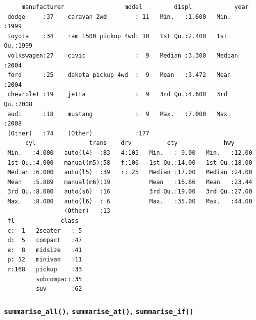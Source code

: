 \documentclass[
  11pt,
]{krantz}
\newenvironment{Shaded}{\begin{snugshade}}{\end{snugshade}}
\newcommand{\CommentTok}[1]{\textcolor[rgb]{0.37,0.37,0.37}{\textit{#1}}}
\newcommand{\KeywordTok}[1]{\textcolor[rgb]{0.27,0.27,0.27}{\textbf{#1}}}
\newcommand{\NormalTok}[1]{#1}
\newcommand{\OperatorTok}[1]{\textcolor[rgb]{0.43,0.43,0.43}{\textbf{#1}}}
\newcommand{\StringTok}[1]{\textcolor[rgb]{0.5,0.5,0.5}{#1}}
\begin{document}
\begin{Shaded}
\end{Shaded}

\begin{verbatim}
     manufacturer                 model         displ            year     
 dodge     :37    caravan 2wd        : 11   Min.   :1.600   Min.   :1999  
 toyota    :34    ram 1500 pickup 4wd: 10   1st Qu.:2.400   1st Qu.:1999  
 volkswagen:27    civic              :  9   Median :3.300   Median :2004  
 ford      :25    dakota pickup 4wd  :  9   Mean   :3.472   Mean   :2004  
 chevrolet :19    jetta              :  9   3rd Qu.:4.600   3rd Qu.:2008  
 audi      :18    mustang            :  9   Max.   :7.000   Max.   :2008  
 (Other)   :74    (Other)            :177                                 
      cyl               trans    drv          cty             hwy       
 Min.   :4.000   auto(l4)  :83   4:103   Min.   : 9.00   Min.   :12.00  
 1st Qu.:4.000   manual(m5):58   f:106   1st Qu.:14.00   1st Qu.:18.00  
 Median :6.000   auto(l5)  :39   r: 25   Median :17.00   Median :24.00  
 Mean   :5.889   manual(m6):19           Mean   :16.86   Mean   :23.44  
 3rd Qu.:8.000   auto(s6)  :16           3rd Qu.:19.00   3rd Qu.:27.00  
 Max.   :8.000   auto(l6)  : 6           Max.   :35.00   Max.   :44.00  
                 (Other)   :13                                          
 fl             class   
 c:  1   2seater   : 5  
 d:  5   compact   :47  
 e:  8   midsize   :41  
 p: 52   minivan   :11  
 r:168   pickup    :33  
         subcompact:35  
         suv       :62  
\end{verbatim}

\normalsize

\hypertarget{summarise-variant}{%
\subsubsection*{\texorpdfstring{\texttt{summarise\_all()}, \texttt{summarise\_at()}, \texttt{summarise\_if()}}{summarise\_all(), summarise\_at(), summarise\_if()}}\label{summarise-variant}}
\end{document}
